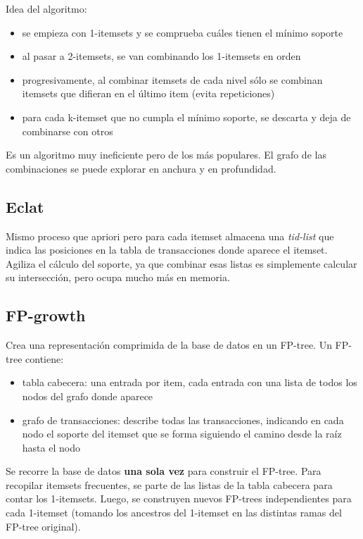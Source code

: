 \documentclass[a4paper,11pt,spanish]{report}
\let\stdsub\subsection
\let\stdsubsub\subsubsection
\renewcommand{\section}{\stdsub}
\renewcommand{\subsection}{\stdsubsub}
\begin{document}
Idea del algoritmo:
\begin{itemize}
\item se empieza con 1-itemsets y se comprueba cuáles tienen el mínimo soporte
\item al pasar a 2-itemsets, se van combinando los 1-itemsets en orden
\item progresivamente, al combinar itemsets de cada nivel sólo se combinan itemsets que difieran en el último item (evita repeticiones)
\item para cada k-itemset que no cumpla el mínimo soporte, se descarta y deja de combinarse con otros
\end{itemize}

Es un algoritmo muy ineficiente pero de los más populares. El grafo de las combinaciones se puede explorar en anchura y en profundidad.

\section{Eclat}
\label{sec-3-3-2}

Mismo proceso que apriori pero para cada itemset almacena una \emph{tid-list} que indica las posiciones en la tabla de transacciones donde aparece el itemset. Agiliza el cálculo del soporte, ya que combinar esas listas es simplemente calcular su intersección, pero ocupa mucho más en memoria.

\section{FP-growth}
\label{sec-3-3-3}

Crea una representación comprimida de la base de datos en un FP-tree. Un FP-tree contiene:
\begin{itemize}
\item tabla cabecera: una entrada por item, cada entrada con una lista de todos los nodos del grafo donde aparece
\item grafo de transacciones: describe todas las transacciones, indicando en cada nodo el soporte del itemset que se forma siguiendo el camino desde la raíz hasta el nodo
\end{itemize}

Se recorre la base de datos \textbf{una sola vez} para construir el FP-tree. Para recopilar itemsets frecuentes, se parte de las listas de la tabla cabecera para contar los 1-itemsets. Luego, se construyen nuevos FP-trees independientes para cada 1-itemset (tomando los ancestros del 1-itemset en las distintas ramas del FP-tree original).
\end{document}
